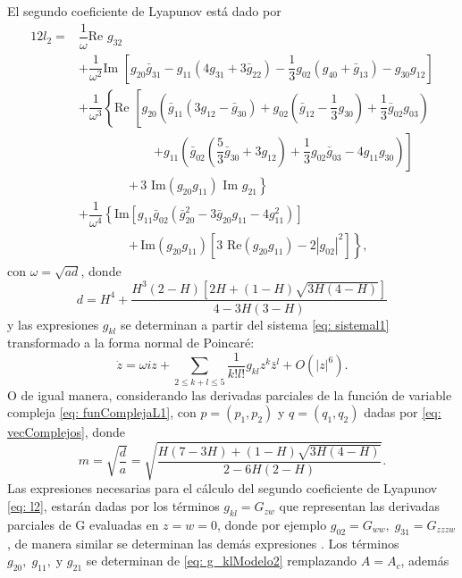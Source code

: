 El segundo coeficiente de Lyapunov está dado por
\begin{equation}
	\begin{aligned}
		12l_2 = {} & \dfrac{1}{\omega} \text{Re } g_{32} \\
		& + \dfrac{1}{\omega^2} \text{Im } \left[ g_{20} \bar{g}_{31} - g_{11} (4 g_{31} + 3 \bar{g}_{22}) - \dfrac{1}{3} g_{02} (g_{40} + \bar{g}_{13}) - g_{30} g_{12} \right] \\
		& + \dfrac{1}{\omega^3} \left\{ \text{Re } \left[ g_{20} \left( \bar{g}_{11} (3 g_{12} - \bar{g}_{30}) + g_{02} \left( \bar{g}_{12} - \dfrac{1}{3} g_{30} \right) + \dfrac{1}{3} \bar{g}_{02} g_{03} \right) \right.\right. \\
		& \qquad\qquad\qquad \left. + g_{11} \left( \bar{g}_{02} \left( \dfrac{5}{3} \bar{g}_{30} + 3 g_{12} \right) + \dfrac{1}{3} g_{02} \bar{g}_{03} - 4 g_{11} g_{30} \right) \right] \\
		& \qquad\qquad \left. + \, 3 \text{ Im}(g_{20} g_{11}) \text{ Im } g_{21} \right\} \\
		& + \dfrac{1}{\omega^4} \left\{ \text{Im} \left[ g_{11} \bar{g}_{02} \left( \bar{g}_{20}^2 - 3 \bar{g}_{20} g_{11} - 4 g_{11}^2 \right) \right] \right. \\
		& \qquad\qquad \left. + \, \text{Im}(g_{20} g_{11}) \left[ 3 \text{ Re}(g_{20} g_{11}) - 2 |g_{02}|^2 \right] \right\},
	\end{aligned}
	\label{eq: l2}
\end{equation}
con $\omega = \sqrt{ad}$, donde $$d = H^4+\dfrac{H^3(2-H) [2H+(1-H) \sqrt{3H(4-H)}]}{4-3H(3-H)}$$ y las expresiones $g_{kl}$ se determinan a partir del sistema \eqref{eq: sistemal1} transformado a la forma normal de Poincaré:
\begin{equation}
	\dot{z} = \omega i z + \sum_{2 \le k+l \le 5} \dfrac{1}{k!l!} g_{kl} z^k \bar{z}^l + O(|z|^6).
	\label{eq: normalForml2}
\end{equation}
O de igual manera, considerando las derivadas parciales de la función de variable compleja \eqref{eq: funComplejaL1},
con $p=(p_1,p_2)$ y $q=(q_1,q_2)$ dadas por \eqref{eq: vecComplejos}, donde $$m = \sqrt{\dfrac{d}{a}} = \sqrt{\dfrac{H(7-3H)+(1-H)\sqrt{3H(4-H)}}{2-6H(2-H)}}.$$ Las expresiones necesarias para el cálculo del segundo coeficiente de Lyapunov \eqref{eq: l2}, estarán dadas por los términos $g_{kl}=G_{z w}$ que representan las derivadas parciales de G evaluadas en $z=w=0$, donde por ejemplo \linebreak $g_{02}=G_{ww}, \; g_{31}=G_{zzzw}$, de manera similar se determinan las demás expresiones \cite[p. 344]{Kuznetsov2023}. Los términos $g_{20}, \; g_{11}, \; \text{y } g_{21}$ se determinan de \eqref{eq: g_klModelo2} remplazando $A=A_c$, además

